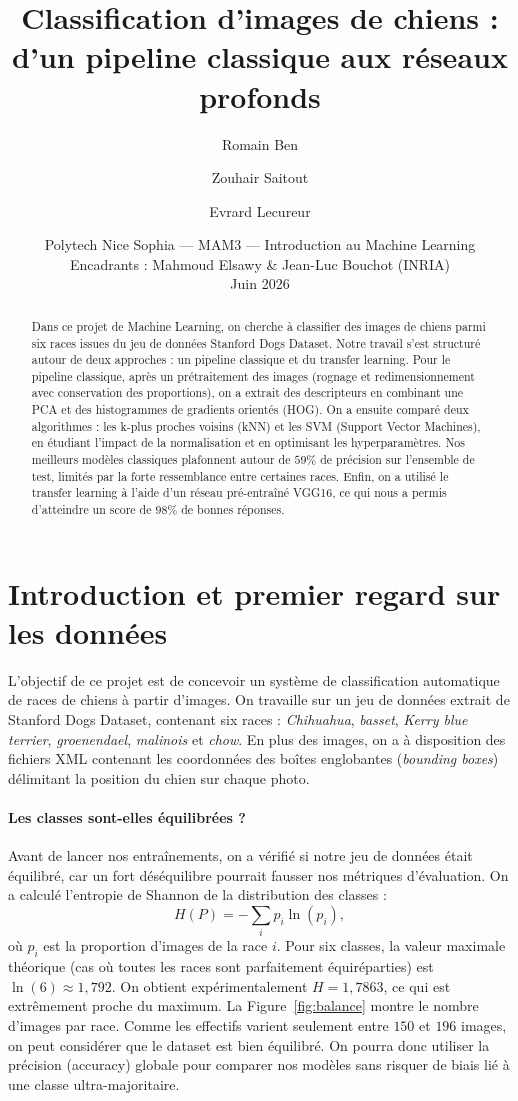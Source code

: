 \documentclass[11pt,a4paper]{article}
\title{\vspace{-1.5cm}\textbf{Classification d'images de chiens :\\ d'un pipeline classique aux réseaux profonds}}
\author{Romain Ben \and Zouhair Saitout \and Evrard Lecureur}
\date{Polytech Nice Sophia --- MAM3 --- Introduction au Machine Learning\\
Encadrants : Mahmoud Elsawy \& Jean-Luc Bouchot (INRIA)\\
Juin 2026}
\begin{document}
\maketitle

\begin{abstract}
\noindent Dans ce projet de Machine Learning, on cherche à classifier des images de chiens parmi six races issues du jeu de données Stanford Dogs Dataset. Notre travail s'est structuré autour de deux approches : un pipeline classique et du transfer learning. Pour le pipeline classique, après un prétraitement des images (rognage et redimensionnement avec conservation des proportions), on a extrait des descripteurs en combinant une PCA et des histogrammes de gradients orientés (HOG). On a ensuite comparé deux algorithmes : les k-plus proches voisins (kNN) et les SVM (Support Vector Machines), en étudiant l'impact de la normalisation et en optimisant les hyperparamètres. Nos meilleurs modèles classiques plafonnent autour de $59\%$ de précision sur l'ensemble de test, limités par la forte ressemblance entre certaines races. Enfin, on a utilisé le transfer learning à l'aide d'un réseau pré-entraîné VGG16, ce qui nous a permis d'atteindre un score de $98\%$ de bonnes réponses.
\end{abstract}

\section{Introduction et premier regard sur les données}

L'objectif de ce projet est de concevoir un système de classification automatique de races de chiens à partir d'images. On travaille sur un jeu de données extrait de Stanford Dogs Dataset, contenant six races : \textit{Chihuahua}, \textit{basset}, \textit{Kerry blue terrier}, \textit{groenendael}, \textit{malinois} et \textit{chow}. En plus des images, on a à disposition des fichiers XML contenant les coordonnées des boîtes englobantes (\textit{bounding boxes}) délimitant la position du chien sur chaque photo.

\paragraph{Les classes sont-elles équilibrées ?} Avant de lancer nos entraînements, on a vérifié si notre jeu de données était équilibré, car un fort déséquilibre pourrait fausser nos métriques d'évaluation. On a calculé l'entropie de Shannon de la distribution des classes :
\begin{equation}
H(P) = -\sum_{i} p_i \ln(p_i),
\end{equation}
où $p_i$ est la proportion d'images de la race $i$. Pour six classes, la valeur maximale théorique (cas où toutes les races sont parfaitement équiréparties) est $\ln(6) \approx 1{,}792$. On obtient expérimentalement $H = 1{,}7863$, ce qui est extrêmement proche du maximum. La Figure~\ref{fig:balance} montre le nombre d'images par race. Comme les effectifs varient seulement entre $150$ et $196$ images, on peut considérer que le dataset est bien équilibré. On pourra donc utiliser la précision (accuracy) globale pour comparer nos modèles sans risquer de biais lié à une classe ultra-majoritaire.
\end{document}
